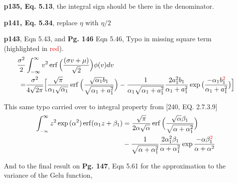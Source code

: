 \documentclass{article}
\DeclareMathOperator{\erf}{erf}
\begin{document}
\textbf{p135, Eq. 5.13}, the integral sign should be there in the denominator.

\textbf{p141, Eq. 5.34}, replace $\eta$ with $\eta / 2$


\textbf{p143}, Eqn 5.43, and \textbf{Pg. 146} Eqn 5.46, Typo in missing square term (highlighted in {\textcolor{red}{red}}).
  \begin{align*}
    \frac{\sigma^{2}}{2} &\int_{-\infty} ^{\infty}v^{2} \erf\Big(\frac{(\sigma v + \mu)}{\sqrt{2}}\Big)\phi(v) dv \nonumber
    \\ = &\frac{\sigma^{2}}{4\sqrt{2\pi}} \Big[ \frac{\sqrt{\pi}}{\alpha_{1} \sqrt{\alpha_{1}}}
    \erf\Big({\frac{\sqrt{\alpha_{1}}b_{1}}{\sqrt{\alpha_{1} + a_{1}^{2}}}}\Big)
    -  \frac{1}{\alpha_{1}\sqrt{\alpha_{1} + a_{1}^{2}}} \frac{2a_{1}^{2}b_{1}}{\alpha_{1} + a_{1}^{2}}
    \exp{\big(\frac{-\alpha_{1} b_{1}^{\textcolor{red}{2}}}{\alpha_{1} + a_{1}^{2}}\big)} \Big]
  \end{align*}

  This same typo carried over to integral property from [240, EQ. 2.7.3.9]
  \begin{align*}
    \int_{_{-\infty}}^{\infty} z^{2}\exp{(\alpha^{2})} \erf(\alpha_{1}z + \beta_{1})
    &=
    \frac{\sqrt{\pi}}{2\alpha \sqrt{\alpha}}
      \erf\Big({\frac{\sqrt{\alpha}\beta_{1}}{\sqrt{\alpha + \alpha_{1}^{2}}}}\Big)
      \nonumber\\&
    -  \frac{1}{\sqrt{\alpha + \alpha_{1}^{2}}} \frac{2\alpha_{1}^{2} \beta_{1}}{\alpha + \alpha_{1}^{2}}
    \exp{\frac{-\alpha \beta_{1}^{\textcolor{red}{2}}}{\alpha + \alpha^{2}}}
  \end{align*}


  And to the final result on \textbf{Pg. 147}, Eqn 5.61 for the approximation to the variance of the Gelu function,
\end{document}
